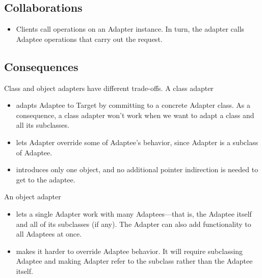 \subsection*{Collaborations}

\begin{itemize}
    \item Clients call operations on an Adapter instance. In turn, the adapter calls Adaptee operations that carry out the request.
\end{itemize}

\subsection*{Consequences}

Class and object adapters have different trade-offs. A class adapter
\begin{itemize}
    \item adapts Adaptee to Target by committing to a concrete Adapter class. As a consequence, a class adapter won't work when we want to adapt a class and all its subclasses.
    \item lets Adapter override some of Adaptee's behavior, since Adapter is a subclass of Adaptee.
    \item introduces only one object, and no additional pointer indirection is needed to get to the adaptee.
\end{itemize}

An object adapter
\begin{itemize}
    \item lets a single Adapter work with many Adaptees—that is, the Adaptee itself and all of its subclasses (if any). The Adapter can also add functionality to all Adaptees at once.
    \item makes it harder to override Adaptee behavior. It will require subclassing Adaptee and making Adapter refer to the subclass rather than the Adaptee itself.
\end{itemize}

